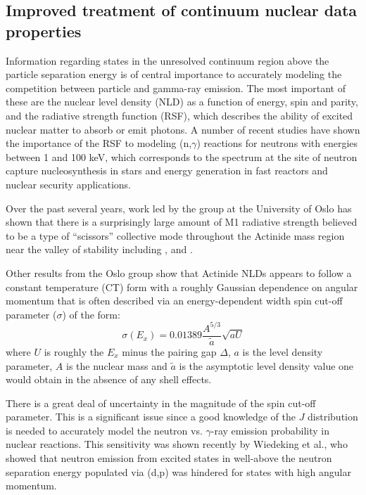 \documentclass[letterpaper,draft]{ar-1col}
\newcommand{\pp}[1]{\left( #1\right)}
\begin{document}
\subsection{Improved treatment of continuum nuclear data properties}

Information regarding states in the unresolved continuum region above the particle separation energy is of central importance to accurately modeling the competition between particle and gamma-ray emission.  The most important of these are the nuclear level density (NLD) as a function of energy, spin and parity, and the radiative strength function (RSF), which describes the ability of excited nuclear matter to absorb or emit photons.  A number of recent studies have shown the importance of the RSF to modeling (n,$\gamma$) reactions for neutrons with energies between 1 and 100 keV, which corresponds to the spectrum at the site of neutron capture nucleosynthesis in stars \cite{PhysRevC.82.014318, Lar15} and energy generation in fast reactors and nuclear security applications.   

Over the past several years, work led by the group at the University of Oslo has shown that there is a surprisingly large amount of M1 radiative strength believed to be a type of \enquote{scissors} collective mode throughout the Actinide mass region near the valley of stability including ,  and  \cite{Lap16, Gut13, Gut13a, Gut14, Gut15}.

Other results from the Oslo group show that Actinide NLDs appears to follow a constant temperature (CT) form with a roughly Gaussian dependence on angular momentum that is often described via an energy-dependent width spin cut-off parameter ($\sigma$) of the form: 
\begin{equation}\label{eqn:spin_cutoff}
\sigma\pp{E_x}=0.01389 \dfrac{A^{5/3}}{\widetilde{a}}\sqrt{aU}
\end{equation}
where $U$ is roughly the $E_x$ minus the pairing gap $\Delta$, $a$ is the level density parameter, $A$ is the nuclear mass and $\widetilde{a}$ is the asymptotic level density value one would obtain in the absence of any shell effects. 

There is a great deal of uncertainty in the magnitude of the spin cut-off parameter.  This is a significant issue since a good knowledge of the $J$ distribution is needed to accurately model the neutron vs. $\gamma$-ray emission probability in nuclear reactions.  This sensitivity was shown recently by Wiedeking et al., \cite{Wie16} who showed that neutron emission from excited states in  well-above the neutron separation energy populated via (d,p) was hindered for states with high angular momentum. 
\end{document}
